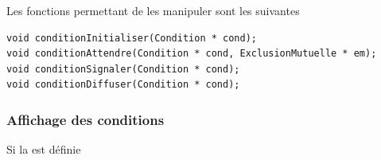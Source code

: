    Les fonctions permettant de les manipuler sont les suivantes

\begin{lstlisting}
void conditionInitialiser(Condition * cond);
void conditionAttendre(Condition * cond, ExclusionMutuelle * em);
void conditionSignaler(Condition * cond);
void conditionDiffuser(Condition * cond);
\end{lstlisting}

%
%
%
\subsubsection{Affichage des conditions}

   Si la  est définie

